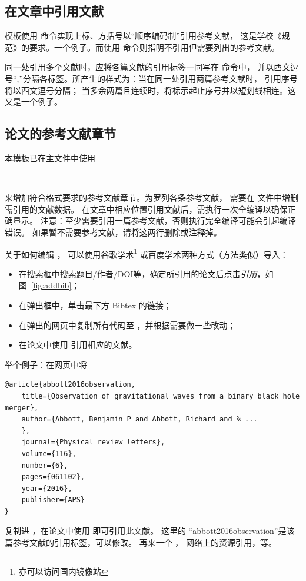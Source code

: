 \subsection{在文章中引用文献}
模板使用 命令实现上标、方括号以“顺序编码制”引用参考文献，
这是学校《规范》的要求。一个例子。\cite{abbott2016observation}而使用
命令则指明不引用但需要列出的参考文献。

同一处引用多个文献时，应将各篇文献的引用标签一同写在  命令中，
并以西文逗号“,”分隔各标签。所产生的样式为：当在同一处引用两篇参考文献时，
引用序号将以西文逗号分隔；
当多余两篇且连续时，将标示起止序号并以短划线相连。这\cite{texbook,latexrumen}
又是\cite{texbook,latexrumen,gbt7714-2005}一个例子。\cite{abbott2016observation,texbook,latexrumen,buctthesis}


\subsection{论文的参考文献章节}
本模板已在主文件中使用
\begin{lstlisting}[numbers=none]


	\end{lstlisting}
来增加符合格式要求的参考文献章节。为罗列各条参考文献，
需要在  文件中增删需引用的文献数据。
在文章中相应位置引用文献后，需执行一次全编译以确保正确显示。
注意：至少需要引用一篇参考文献，否则执行完全编译可能会引起编译错误。
如果暂不需要参考文献，请将这两行删除或注释掉。

关于如何编辑 ，
可以使用\href{http://scholar.google.com.cn/}{谷歌学术}\footnote{亦可以访问国内镜像站}%
或\href{http://xueshu.baidu.com}{百度学术}两种方式（方法类似）导入\BibTeX{}：
\begin{itemize}
	\item 在搜索框中搜索题目/作者/DOI等，确定所引用的论文后点击\emph{引用}，如图~\ref{fig:addbib}；
	\item 在弹出框中，单击最下方 Bibtex 的链接；
	\item 在弹出的网页中复制所有代码至 ，并根据需要做一些改动；
	\item 在论文中使用 引用相应的文献。
\end{itemize}

举个例子：在网页中将
\begin{lstlisting}
@article{abbott2016observation,
	title={Observation of gravitational waves from a binary black hole merger},
	author={Abbott, Benjamin P and Abbott, Richard and % ...
	},
	journal={Physical review letters},
	volume={116},
	number={6},
	pages={061102},
	year={2016},
	publisher={APS}
}
	\end{lstlisting}
复制进 ，在论文中使用
即可引用此文献。
这里的 “abbott2016observation”是该篇参考文献的引用标签，可以修改。
再来一个\cite{ashirov2008tetramerization} ，
网络上的资源引用\cite{buctthesis}，等。

